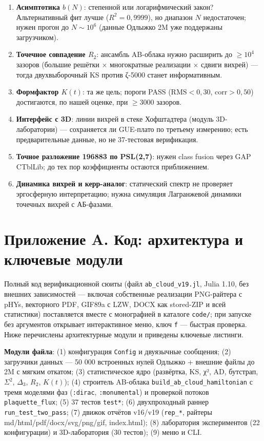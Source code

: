 \documentclass[
]{article}
\providecommand{\tightlist}{%
  \setlength{\itemsep}{0pt}\setlength{\parskip}{0pt}}
\begin{document}
\begin{enumerate}
\def\labelenumi{\arabic{enumi}.}
\tightlist
\item
  \textbf{Асимптотика \(b(N)\)}: степенной или логарифмический закон?
  Альтернативный фит лучше (\(R^2=0{,}9999\)), но диапазон \(N\)
  недостаточен; нужен прогон до \(N\sim10^6\) (данные Одлыжко 2M уже
  поддержаны загрузчиком).
\item
  \textbf{Точечное совпадение \(R_2\)}: ансамбль AB-облака нужно
  расширить до \(\ge10^4\) зазоров (большие решётки × многократные
  реализации × сдвиги вихрей) --- тогда двухвыборочный KS против ζ-5000
  станет информативным.
\item
  \textbf{Формфактор \(K(t)\)}: та же цель; пороги PASS
  (\(\mathrm{RMS}<0{,}30\), \(\mathrm{corr}>0{,}50\)) достигаются, по
  нашей оценке, при \(\ge3000\) зазоров.
\item
  \textbf{Интерфейс с 3D}: линии вихрей в стеке Хофштадтера (модуль
  3D-лаборатории) --- сохраняется ли GUE-плато по третьему измерению;
  есть предварительные данные, но не 37-тестовая верификация.
\item
  \textbf{Точное разложение 196883 по PSL(2,7)}: нужен class fusion
  через GAP CTblLib; до тех пор коэффициенты остаются приближением.
\item
  \textbf{Динамика вихрей и керр-аналог}: статический спектр не
  проверяет эргосферную интерпретацию; нужна симуляция Лагранжевой
  динамики точечных вихрей с АБ-фазами.
\end{enumerate}

\section{Приложение A. Код: архитектура и ключевые
модули}\label{ux43fux440ux438ux43bux43eux436ux435ux43dux438ux435-a.-ux43aux43eux434-ux430ux440ux445ux438ux442ux435ux43aux442ux443ux440ux430-ux438-ux43aux43bux44eux447ux435ux432ux44bux435-ux43cux43eux434ux443ux43bux438}

Полный код верификационной сюиты (файл \texttt{ab\_cloud\_v19.jl}, Julia
1.10, без внешних зависимостей --- включая собственные реализации
PNG-райтера с pHYs, векторного PDF, GIF89a с LZW, DOCX как stored-ZIP и
всей статистики) поставляется вместе с монографией в каталоге
\texttt{code/}; при запуске без аргументов открывает интерактивное меню,
ключ \texttt{f} --- быстрая проверка. Ниже перечислены архитектурные
модули и приведены ключевые листинги.

\textbf{Модули файла}: (1) конфигурация \texttt{Config} и двуязычные
сообщения; (2) загрузчики данных --- 50 000 встроенных нулей Одлыжко +
внешние файлы до 2M с мягким откатом; (3) статистическое ядро
(развёртка, KS, χ², AD, бутстрап, \(\Sigma^2\), \(\Delta_3\), \(R_2\),
\(K(t)\)); (4) строитель AB-облака
\texttt{build\_ab\_cloud\_hamiltonian} с тремя моделями фаз
(\texttt{:dirac}, \texttt{:monumental}) и проверкой потоков
\texttt{plaquette\_flux}; (5) 37 тестов \texttt{test*}; (6)
двухпроходный раннер \texttt{run\_test\_two\_pass}; (7) движок отчётов
v16/v19 (\texttt{rep\_*}, райтеры md/html/pdf/docx/svg/png/gif,
index.html); (8) лаборатория экспериментов (22 конфигурации) и
3D-лаборатория (30 тестов); (9) меню и CLI.
\end{document}
